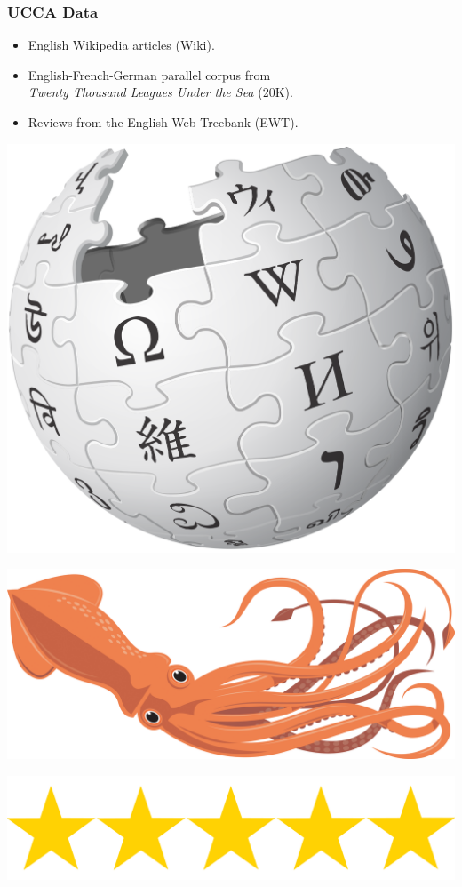 \documentclass[t,xcolor={svgnames,table}]{beamer}
\begin{document}
\begin{frame}
\frametitle{UCCA Data}
\begin{itemize}
 \item English Wikipedia articles (Wiki).
 \item English-French-German parallel corpus from \\ \textit{Twenty Thousand Leagues Under the Sea} (20K).
 \item Reviews from the English Web Treebank (EWT).
\end{itemize}

\vfill
\begin{center}
  \begin{minipage}{.3\textwidth}\includegraphics[width=\textwidth]{wikipedia.png}\end{minipage}
  \begin{minipage}{.3\textwidth}\includegraphics[width=\textwidth]{squid.jpg}\end{minipage}
  
  \includegraphics[width=.3\textwidth]{five-stars.png}
\end{center}
\end{frame}
\end{document}
